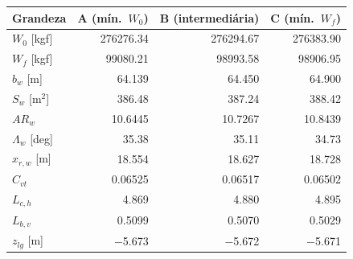 \begin{tabular}{lrrr}
\toprule
Grandeza & A (mín.\ $W_0$) & B (intermediária) & C (mín.\ $W_f$) \\
\midrule
$W_0$ [kgf] & 276276.34 & 276294.67 & 276383.90 \\
$W_f$ [kgf] & 99080.21 & 98993.58 & 98906.95 \\
$b_w$ [m] & 64.139 & 64.450 & 64.900 \\
$S_w$ [m$^2$] & 386.48 & 387.24 & 388.42 \\
$AR_w$ & 10.6445 & 10.7267 & 10.8439 \\
$\Lambda_w$ [deg] & 35.38 & 35.11 & 34.73 \\
$x_{r,w}$ [m] & 18.554 & 18.627 & 18.728 \\
$C_{vt}$ & 0.06525 & 0.06517 & 0.06502 \\
$L_{c,h}$ & 4.869 & 4.880 & 4.895 \\
$L_{b,v}$ & 0.5099 & 0.5070 & 0.5029 \\
$z_{lg}$ [m] & $-$5.673 & $-$5.672 & $-$5.671 \\
\bottomrule
\end{tabular}